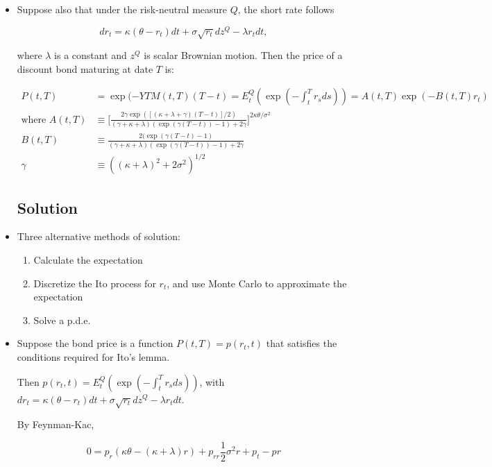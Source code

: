 \documentclass{article}
\begin{document}
\begin{itemize}
\item Suppose also that under the risk-neutral measure $Q$, the short rate follows 

$$
dr_t = \kappa (\theta - r_t) dt + \sigma \sqrt{r_t} dz^Q - \lambda r_t dt,
$$

where $\lambda$ is a constant and $z^Q$ is scalar Brownian motion.  Then the price of a discount bond maturing at date $T$ is:

\begin{align*}
P(t, T) &= \exp(-YTM(t, T) (T-t) = E_t^Q(\exp(-\int_t^T r_s ds)) = A(t, T) \exp(-B(t, T) r_t)\\
\text{where }
A(t, T) &\equiv \Bigg[ \frac{2 \gamma \exp([(\kappa + \lambda + \gamma)(T-t)]/2)}{(\gamma + \kappa + \lambda)(\exp(\gamma(T-t)) - 1) + 2 \gamma} \Bigg]^{2 \kappa \theta / \sigma^2}\\
B(t, T) &\equiv  \frac{2  (\exp(\gamma(T-t) - 1)}{(\gamma + \kappa + \lambda)(\exp(\gamma(T-t)) - 1) + 2 \gamma}\\
\gamma &\equiv ((\kappa + \lambda)^2 + 2 \sigma^2)^{1/2}
\end{align*}

\subsection*{Solution}

\item Three alternative methods of solution:

\begin{enumerate}

\item Calculate the expectation

\item Discretize the Ito process for $r_t$, and use Monte Carlo to approximate the expectation

\item Solve a p.d.e.

\end{enumerate}

\item Suppose the bond price is a function $P(t, T) = p(r_t, t)$ that satisfies the conditions required for Ito's lemma. 

Then $p(r_t, t) = E_t^Q(\exp(-\int_t^T r_s ds))$, with $dr_t = \kappa (\theta - r_t)dt + \sigma \sqrt{r_t} dz^Q - \lambda r_t dt$.

By Feynman-Kac, 

$$
0 = p_r (\kappa \theta - (\kappa + \lambda)r) + p_{rr} \frac{1}{2} \sigma^2 r + p_t - p r
$$


\end{itemize}
\end{document}
